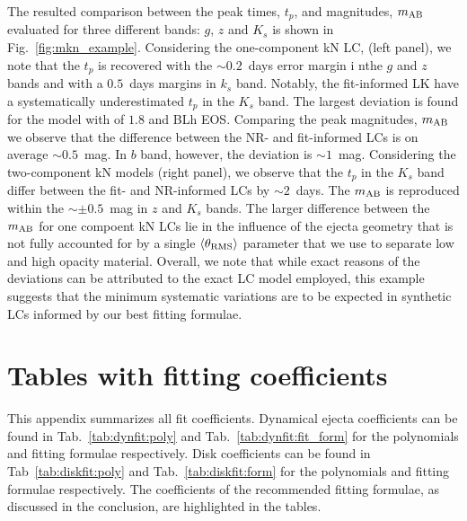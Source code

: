 The resulted comparison between the peak times, $t_p$, and magnitudes, $m_{\rm AB}$ 
evaluated for three different bands: $g$, $z$ and $K_s$ 
is shown in Fig.~\ref{fig:mkn_example}.
Considering the one-component \ac{kN} \ac{LC}, (left panel), we note that the $t_p$ is 
recovered with the ${\sim}0.2$~days error margin i nthe $g$ and $z$ bands and with a 
$0.5$~days margins in $k_s$ band. Notably, the fit-informed \ac{LK} have a systematically
underestimated $t_p$ in the $K_s$ band. 
The largest deviation is found for the model with \mr{} of $1.8$ and BLh \ac{EOS}.
Comparing the peak magnitudes, $m_{\rm AB}$ we observe that the difference 
between the \ac{NR}- and fit-informed \acp{LC} is on average ${\sim}0.5$~mag. 
In $b$ band, however, the deviation is ${\sim}1$~mag.
Considering the two-component \ac{kN} models (right panel), we observe that the 
$t_p$ in the $K_s$ band differ between the fit- and \ac{NR}-informed \acp{LC} by 
${\sim}2$~days. The $m_{\rm AB}$ is reproduced within the ${\sim}\pm 0.5$~mag in $z$ 
and $K_s$ bands.
The larger difference between the $m_{\rm AB}$ for one compoent \ac{kN} \acp{LC} lie 
in the influence of the ejecta geometry that is not fully accounted for by a single 
$\langle\theta_{\rm RMS}\rangle$ parameter that we use to separate low and high opacity material. 
Overall, we note that while exact reasons of the deviations can be attributed to 
the exact \ac{LC} model employed, this example suggests that the minimum systematic 
variations are to be expected in synthetic \acp{LC} informed by our best fitting formulae.



\section{Tables with fitting coefficients}
\label{app:coefs}

This appendix summarizes all fit coefficients.
Dynamical ejecta coefficients can be found in 
Tab.~\ref{tab:dynfit:poly} and 
Tab.~\ref{tab:dynfit:fit_form} for the polynomials and fitting
formulae respectively.
Disk coefficients can be found in 
Tab~\ref{tab:diskfit:poly} and 
Tab.~\ref{tab:diskfit:form} for the polynomials and fitting
formulae respectively.
The coefficients of the recommended fitting formulae, as discussed in
the conclusion, are highlighted in the tables.


  
